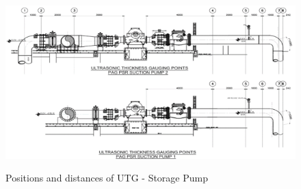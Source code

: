 \begin{figure}[!htb]
	\includegraphics[scale=1.3]{figures/ch04_fig_utgsp} \\
	\caption{Positions and distances of UTG - Storage Pump}
	\label{ch04_fig_utgsp} 
\end{figure}


%			


